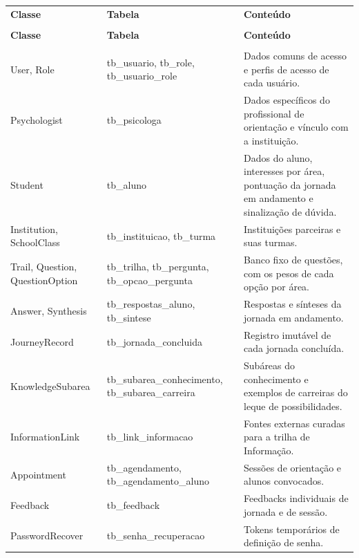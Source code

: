 {\ABNTEXfontereduzida
\renewcommand{\arraystretch}{1.25}
\begin{xltabular}{\textwidth}{|>{\raggedright\arraybackslash}p{3.9cm}|>{\raggedright\arraybackslash}p{4.9cm}|>{\raggedright\arraybackslash}X|}
 \\[0.3em]
\hline
\textbf{Classe} & \textbf{Tabela} & \textbf{Conteúdo} \\
\hline
\endfirsthead
{} \\
\hline
\textbf{Classe} & \textbf{Tabela} & \textbf{Conteúdo} \\
\hline
\endhead
{} \\
\endfoot
\endlastfoot
User, Role & tb\_usuario, tb\_role, tb\_usuario\_role & Dados comuns de acesso e perfis de acesso de cada usuário. \\
\hline
Psychologist & tb\_psicologa & Dados específicos do profissional de orientação e vínculo com a instituição. \\
\hline
Student & tb\_aluno & Dados do aluno, interesses por área, pontuação da jornada em andamento e sinalização de dúvida. \\
\hline
Institution, SchoolClass & tb\_instituicao, tb\_turma & Instituições parceiras e suas turmas. \\
\hline
Trail, Question, QuestionOption & tb\_trilha, tb\_pergunta, tb\_opcao\_pergunta & Banco fixo de questões, com os pesos de cada opção por área. \\
\hline
Answer, Synthesis & tb\_respostas\_aluno, tb\_sintese & Respostas e sínteses da jornada em andamento. \\
\hline
JourneyRecord & tb\_jornada\_concluida & Registro imutável de cada jornada concluída. \\
\hline
KnowledgeSubarea & tb\_subarea\_conhecimento, tb\_subarea\_carreira & Subáreas do conhecimento e exemplos de carreiras do leque de possibilidades. \\
\hline
InformationLink & tb\_link\_informacao & Fontes externas curadas para a trilha de Informação. \\
\hline
Appointment & tb\_agendamento, tb\_agendamento\_aluno & Sessões de orientação e alunos convocados. \\
\hline
Feedback & tb\_feedback & Feedbacks individuais de jornada e de sessão. \\
\hline
PasswordRecover & tb\_senha\_recuperacao & Tokens temporários de definição de senha. \\
\hline
\end{xltabular}
}

